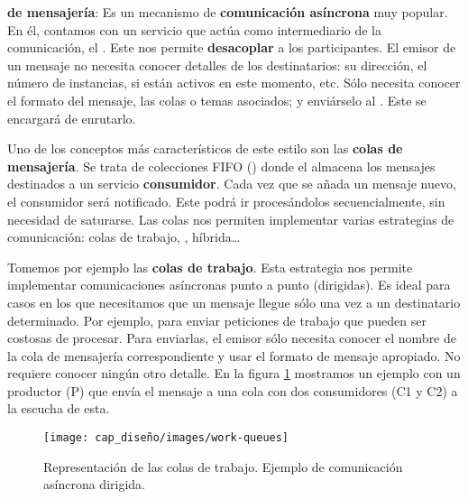\textbf{ de mensajería}: Es un mecanismo de \textbf{comunicación asíncrona} muy popular. En él, contamos con un servicio que actúa como intermediario de la comunicación, el \textbf{}. \cite{newmanBuildingMicroservicesDesigning2021} Este nos permite \textbf{desacoplar} a los participantes. \cite{korabUnderstandingMessageBrokers2017} El emisor de un mensaje no necesita conocer detalles de los destinatarios: su dirección, el número de instancias, si están activos en este momento, etc. Sólo necesita conocer el formato del mensaje, las colas o temas asociados; y enviárselo al . Este se encargará de enrutarlo.

Uno de los conceptos más característicos de este estilo son las \textbf{colas de mensajería}. Se trata de colecciones FIFO () donde el  almacena los mensajes destinados a un servicio \textbf{consumidor}. Cada vez que se añada un mensaje nuevo, el consumidor será notificado. Este podrá ir procesándolos secuencialmente, sin necesidad de saturarse. Las colas nos permiten implementar varias estrategias de comunicación: colas de trabajo, , híbrida\dots

Tomemos por ejemplo las \textbf{colas de trabajo}. \cite{royChapterMessagePatterns2017} Esta estrategia nos permite implementar comunicaciones asíncronas punto a punto (dirigidas). Es ideal para casos en los que necesitamos que un mensaje llegue sólo una vez a un destinatario determinado. \cite{ibmcorporationWhatAreMessage2020} Por ejemplo, para enviar peticiones de trabajo que pueden ser costosas de procesar. Para enviarlas, el emisor sólo necesita conocer el nombre de la cola de mensajería correspondiente y usar el formato de mensaje apropiado. No requiere conocer ningún otro detalle. En la figura \ref{fig:work-queues} mostramos un ejemplo con un productor (P) que envía el mensaje a una cola con dos consumidores (C1 y C2) a la escucha de esta.

\begin{figure}[htb]
  \centering
  \texttt{[image: cap\_diseño/images/work-queues]}
  \caption[Representación de las colas de trabajo. Ejemplo de comunicación asíncrona dirigida.]{Representación de las colas de trabajo. Ejemplo de comunicación asíncrona dirigida. \footnotemark }
  \label{fig:work-queues}
\end{figure}


